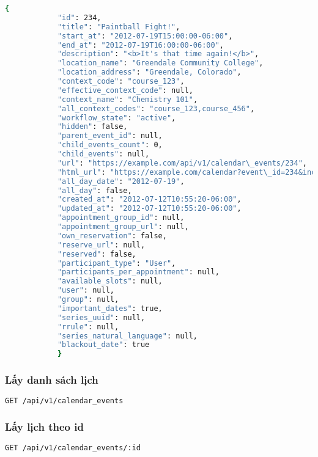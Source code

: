 \documentclass[../Thesis.tex]{subfiles}
\begin{document}
        \begin{lstlisting}[language=bash]
            {
            "id": 234,
            "title": "Paintball Fight!",
            "start_at": "2012-07-19T15:00:00-06:00",
            "end_at": "2012-07-19T16:00:00-06:00",
            "description": "<b>It's that time again!</b>",
            "location_name": "Greendale Community College",
            "location_address": "Greendale, Colorado",
            "context_code": "course_123",
            "effective_context_code": null,
            "context_name": "Chemistry 101",
            "all_context_codes": "course_123,course_456",
            "workflow_state": "active",
            "hidden": false,
            "parent_event_id": null,
            "child_events_count": 0,
            "child_events": null,
            "url": "https://example.com/api/v1/calendar\_events/234",
            "html_url": "https://example.com/calendar?event\_id=234&include\_contexts=course_123",
            "all_day_date": "2012-07-19",
            "all_day": false,
            "created_at": "2012-07-12T10:55:20-06:00",
            "updated_at": "2012-07-12T10:55:20-06:00",
            "appointment_group_id": null,
            "appointment_group_url": null,
            "own_reservation": false,
            "reserve_url": null,
            "reserved": false,
            "participant_type": "User",
            "participants_per_appointment": null,
            "available_slots": null,
            "user": null,
            "group": null,
            "important_dates": true,
            "series_uuid": null,
            "rrule": null,
            "series_natural_language": null,
            "blackout_date": true
            }
        \end{lstlisting}
        \subsubsection{Lấy danh sách lịch}
        \begin{lstlisting}[language=bash]
            GET /api/v1/calendar_events
        \end{lstlisting}

        \subsubsection{Lấy lịch theo id}
        \begin{lstlisting}[language=bash]
            GET /api/v1/calendar_events/:id
        \end{lstlisting}
\end{document}

